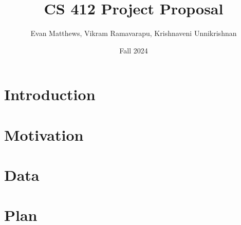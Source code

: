\documentclass[12pt]{extarticle}
\title{CS 412 Project Proposal}
\author{Evan Matthews, Vikram Ramavarapu, Krishnaveni Unnikrishnan}
\date{Fall 2024}
\begin{document}
\maketitle

\section{Introduction}

\section{Motivation}

\section{Data}

\section{Plan}



\end{document}
